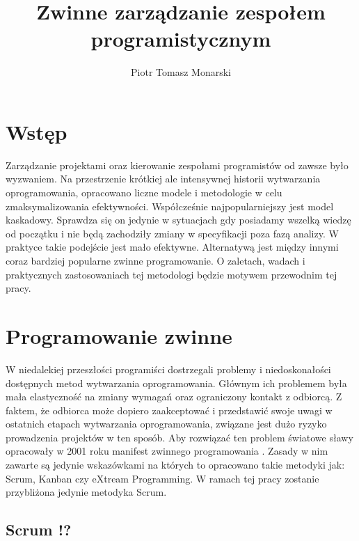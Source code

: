 


\title{Zwinne zarządzanie zespołem programistycznym}
\author{Piotr Tomasz Monarski}



\maketitle

\section{Wstęp}

Zarządzanie projektami oraz kierowanie zespołami programistów od zawsze było wyzwaniem. Na przestrzenie krótkiej ale intensywnej historii wytwarzania oprogramowania, opracowano liczne modele i metodologie w celu zmaksymalizowania efektywności. Współcześnie najpopularniejszy jest model kaskadowy. Sprawdza się on jedynie w sytuacjach gdy posiadamy wszelką wiedzę od początku i nie będą zachodziły zmiany w specyfikacji poza fazą analizy. W praktyce takie podejście jest mało efektywne. Alternatywą jest między innymi coraz bardziej popularne zwinne programowanie. O zaletach, wadach i praktycznych zastosowaniach tej metodologi będzie motywem przewodnim tej pracy. 

\section{Programowanie zwinne}

W niedalekiej przeszłości programiści dostrzegali problemy i niedoskonałości dostępnych metod wytwarzania oprogramowania. Głównym ich problemem była mała elastyczność na zmiany wymagań oraz ograniczony kontakt z odbiorcą. Z faktem, że odbiorca może dopiero zaakceptować i przedstawić swoje uwagi w ostatnich etapach wytwarzania oprogramowania, związane jest dużo ryzyko prowadzenia projektów w ten sposób. Aby rozwiązać ten problem światowe sławy opracowały w 2001 roku manifest zwinnego programowania \cite{agile_manifesto}. Zasady w nim zawarte są jedynie wskazówkami na których to opracowano takie metodyki jak: Scrum, Kanban czy eXtream Programming. W ramach tej pracy zostanie przybliżona jedynie metodyka Scrum.

\subsection{Scrum !?}

